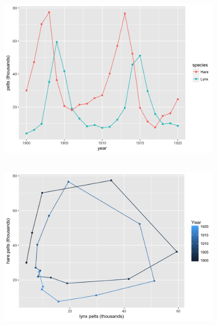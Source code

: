 \documentclass[10pt]{report}
\begin{document}
%
\\[-4pt] \spc
\includegraphics[width=0.85\textwidth]{img/hare-lynx-pelts-1.png}


%
\\[-4pt] \spc
\includegraphics[width=0.85\textwidth]{img/hare-lynx-pelts-2.png}


%
\end{document}
